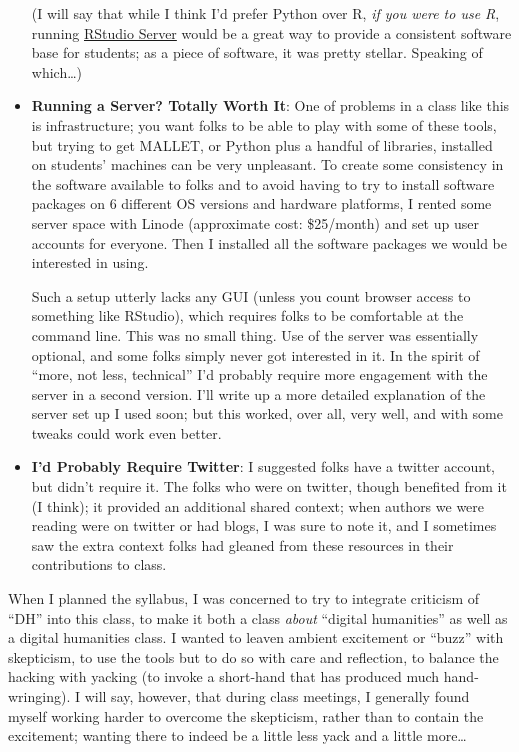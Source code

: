 \documentclass[
  12pt,
]{article}
\begin{document}
\begin{itemize}
  (I will say that while I think I'd prefer Python over R, \emph{if you
  were to use R}, running
  \href{http://www.rstudio.com/ide/docs/server/getting_started}{RStudio
  Server} would be a great way to provide a consistent software base for
  students; as a piece of software, it was pretty stellar. Speaking of
  which\ldots)
\item
  \textbf{Running a Server? Totally Worth It}: One of problems in a
  class like this is infrastructure; you want folks to be able to play
  with some of these tools, but trying to get MALLET, or Python plus a
  handful of libraries, installed on students' machines can be very
  unpleasant. To create some consistency in the software available to
  folks and to avoid having to try to install software packages on 6
  different OS versions and hardware platforms, I rented some server
  space with Linode (approximate cost: \$25/month) and set up user
  accounts for everyone. Then I installed all the software packages we
  would be interested in using.

  Such a setup utterly lacks any GUI (unless you count browser access to
  something like RStudio), which requires folks to be comfortable at the
  command line. This was no small thing. Use of the server was
  essentially optional, and some folks simply never got interested in
  it. In the spirit of ``more, not less, technical'' I'd probably
  require more engagement with the server in a second version. I'll
  write up a more detailed explanation of the server set up I used soon;
  but this worked, over all, very well, and with some tweaks could work
  even better.
\item
  \textbf{I'd Probably Require Twitter}: I suggested folks have a
  twitter account, but didn't require it. The folks who were on twitter,
  though benefited from it (I think); it provided an additional shared
  context; when authors we were reading were on twitter or had blogs, I
  was sure to note it, and I sometimes saw the extra context folks had
  gleaned from these resources in their contributions to class.
\end{itemize}

When I planned the syllabus, I was concerned to try to integrate
criticism of ``DH'' into this class, to make it both a class
\emph{about} ``digital humanities'' as well as a digital humanities
class. I wanted to leaven ambient excitement or ``buzz'' with
skepticism, to use the tools but to do so with care and reflection, to
balance the hacking with yacking (to invoke a short-hand that has
produced much hand-wringing). I will say, however, that during class
meetings, I generally found myself working harder to overcome the
skepticism, rather than to contain the excitement; wanting there to
indeed be a little less yack and a little more\ldots{}
\end{document}
